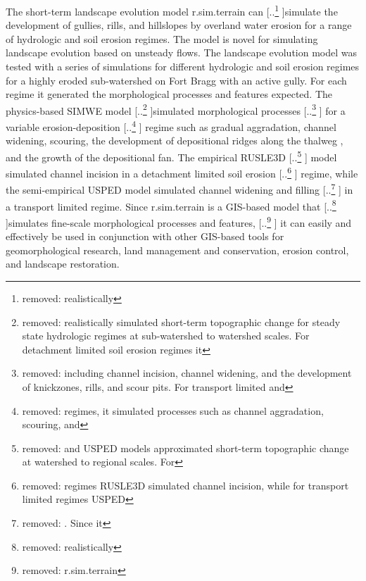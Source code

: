\documentclass[gmd, manuscript]{copernicus}
\providecommand{\DIFadd}[1]{{\protect\color{blue} \sf #1}} %
\providecommand{\DIFdel}[1]{{\protect\color{red} [..\footnote{removed: #1} ]}} %
\providecommand{\DIFaddbegin}{} %
\providecommand{\DIFaddend}{} %
\providecommand{\DIFdelbegin}{} %
\providecommand{\DIFdelend}{} %
\begin{document}
\DIFaddend %
\conclusions

The short-term landscape evolution model 
r.sim.terrain can \DIFdelbegin \DIFdel{realistically }\DIFdelend simulate the development of 
gullies, rills, and hillslopes by overland water erosion
for a range of hydrologic and soil erosion regimes.
The \DIFaddbegin \DIFadd{model is novel for simulating landscape evolution
based on unsteady flows. 
The }\DIFaddend landscape evolution model was tested
with a series of simulations for different 
hydrologic and soil erosion regimes
for a highly eroded sub-watershed on Fort Bragg
with an active gully.
For each regime it generated the 
morphological processes and features expected.
The physics-based SIMWE model 
\DIFdelbegin \DIFdel{realistically simulated short-term topographic change
for steady state hydrologic regimes
at sub-watershed to watershed scales. 
For detachment limited soil erosion regimes
it }\DIFdelend simulated morphological processes 
\DIFdelbegin \DIFdel{including
channel incision, channel widening, and 
the development of knickzones, rills, and scour pits.
For transport limited and }\DIFdelend \DIFaddbegin \DIFadd{for a }\DIFaddend variable erosion-deposition \DIFdelbegin \DIFdel{regimes,
it simulated processes such as 
channel aggradation, scouring, and }\DIFdelend \DIFaddbegin \DIFadd{regime such as 
gradual aggradation, channel widening, 
scouring, }\DIFaddend the development of
depositional ridges along the thalweg\DIFaddbegin \DIFadd{,
and the growth of the depositional fan}\DIFaddend .
The empirical RUSLE3D \DIFdelbegin \DIFdel{and USPED models
approximated short-term topographic change
at watershed to regional scales. 
For }\DIFdelend \DIFaddbegin \DIFadd{model simulated channel incision
in a }\DIFaddend detachment limited soil erosion \DIFdelbegin \DIFdel{regimes 
RUSLE3D simulated channel incision,
while for transport limited regimes
USPED }\DIFdelend \DIFaddbegin \DIFadd{regime,
while the semi-empirical USPED model
}\DIFaddend simulated channel widening and filling
\DIFdelbegin \DIFdel{. 
Since it }\DIFdelend \DIFaddbegin \DIFadd{in a transport limited regime. 
Since r.sim.terrain }\DIFaddend is a GIS-based model that \DIFdelbegin \DIFdel{realistically }\DIFdelend simulates 
fine-scale morphological processes and features,
\DIFdelbegin \DIFdel{r.sim.terrain }\DIFdelend \DIFaddbegin \DIFadd{it }\DIFaddend can easily and effectively be used 
in conjunction with other GIS-based tools
for geomorphological research,
land management and conservation,
erosion control, and landscape restoration. 
\end{document}
